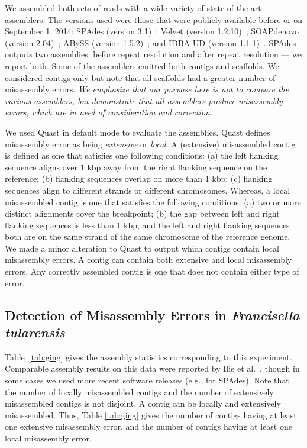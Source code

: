 \documentclass[doctor]{thesis}
\begin{document}
We assembled both sets of reads with a wide variety of state-of-the-art assemblers.  The versions used were those that were publicly available before or on September 1, 2014: 
SPAdes (version 3.1)~\cite{spades}; Velvet (version  1.2.10)~\cite{Zerbino:2008}; SOAPdenovo (version 2.04)~\cite{soap}; ABySS (version 1.5.2)~\cite{Simpson:2009}; and IDBA-UD (version 1.1.1)~\cite{idbaud}.
SPAdes outputs two assemblies: before repeat resolution and after repeat resolution --- we report both.
Some of the assemblers emitted both contigs and scaffolds.  We considered contigs only but note that all scaffolds had a greater number of misassembly errors. 
{\em We emphasize that our purpose here is not to compare the various assemblers, but demonstrate that all assemblers produce misassembly errors, which are in need of consideration and correction.  } 

We used Quast \cite{quast} in default mode to evaluate the assemblies.  
Quast defines misassembly error as being {\em extensive} or {\em local}.  
A (extensive) misassembled contig is defined as one that satisfies one following conditions:  (a) the left flanking sequence aligns over 1 kbp away from the right flanking sequence on the reference; (b) flanking sequences overlap on more than 1 kbp; (c) flanking sequences align to different strands or different chromosomes. 
Whereas, a local misassembled contig is one that satisfies the following conditions: (a) two or more distinct alignments cover the breakpoint; (b) the gap between left and right flanking sequences is less than 1 kbp; and the left and right flanking sequences both are on the same strand of the same chromosome of the reference genome.  
We made a minor alteration to Quast to output which contigs contain local misassembly errors.  
A contig can contain both extensive and local misassembly errors.  
Any correctly assembled contig is one that does not contain either type of error.  

\subsection{Detection of Misassembly Errors in {\em Francisella tularensis}} \label{sec:tularensis}

Table~\ref{tab:ging} gives the assembly statistics corresponding to this experiment.  
Comparable assembly results on this data were reported by Ilie et al.~\cite{sage}, though in some cases we used more recent software releases (e.g., for SPAdes).  
Note that the number of locally misassembled contigs and the number of extensively misassembled contigs is not disjoint.
A contig can be locally and extensively misassembled.   
Thus, Table \ref{tab:ging} gives the number of contigs having at least one extensive misassembly error, and the number of contigs having at least one local misassembly error.
\end{document}
